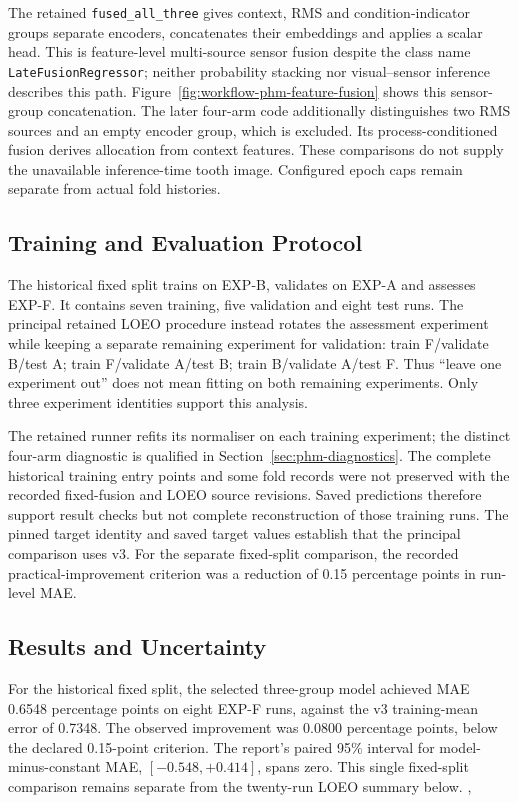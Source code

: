 The retained \texttt{fused\_all\_three} gives context, RMS and condition-indicator
groups separate encoders, concatenates their embeddings and applies a scalar head. This
is feature-level multi-source sensor fusion despite the class name
\texttt{LateFusionRegressor}; neither probability stacking nor visual--sensor inference
describes this path. Figure~\ref{fig:workflow-phm-feature-fusion} shows this
sensor-group concatenation. The later four-arm code additionally distinguishes two RMS sources
and an empty encoder group, which is excluded. Its process-conditioned fusion derives
allocation from context features. These comparisons do not supply the unavailable
inference-time tooth image. Configured epoch caps remain separate from actual fold
histories.

\subsection{Training and Evaluation Protocol}
The historical fixed split trains on EXP-B, validates on EXP-A and assesses EXP-F. It
contains seven training, five validation and eight test runs. The principal retained
LOEO procedure instead rotates the assessment experiment while keeping a separate
remaining experiment for validation: train F/validate B/test A; train F/validate A/test
B; train B/validate A/test F. Thus ``leave one experiment out'' does not mean fitting on
both remaining experiments. Only three experiment identities support this analysis.

The retained runner refits its normaliser on each training experiment; the distinct
four-arm diagnostic is qualified in Section~\ref{sec:phm-diagnostics}. The complete historical training entry points and some fold records were not preserved
with the recorded fixed-fusion and LOEO source revisions. Saved predictions therefore
support result checks but not complete reconstruction of those training runs. The pinned
target identity and saved target values establish that the principal comparison uses v3.
For the separate fixed-split comparison, the recorded practical-improvement criterion
was a reduction of 0.15 percentage points in run-level MAE.

\subsection{Results and Uncertainty}
For the historical fixed split, the selected three-group model achieved MAE 0.6548
percentage points on eight EXP-F runs, against the v3 training-mean error of 0.7348.
The observed improvement was 0.0800 percentage points, below the declared 0.15-point
criterion. The report's paired 95\% interval for model-minus-constant MAE,
$[-0.548, +0.414]$, spans zero. This single fixed-split comparison remains separate
from the twenty-run LOEO summary below.
{, }


